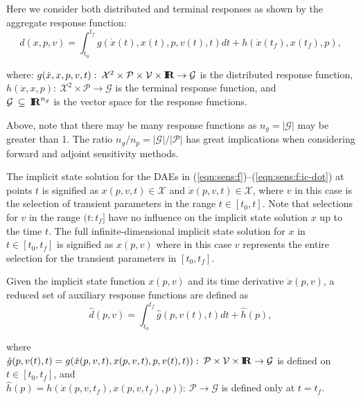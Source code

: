 \documentclass[pdf,ps2pdf,11pt]{SANDreport}
\begin{document}
Here we consider both distributed and terminal responses as shown by the
aggregate response function:
%
\begin{equation}
d(x,p,v)
= \int_{t_0}^{t_f} g(\dot{x}(t),x(t),p,v(t),t) dt + h(\dot{x}(t_f),x(t_f),p),
\label{eqn:sens:d}
\end{equation}
%

where:
\bifthen
%
%
{}\> $g(\dot{x},x,p,v,t) :{}\:
{}\mathcal{X}^2{}\times{}\mathcal{P}{}\times{}\mathcal{V}{}\times{}\mbox{\textbf{I}}\hspace{-0.6ex}\mbox{\textbf{R}}
{}\rightarrow{}\mathcal{G}$ is the distributed response function, \\
%
{}\> $h(\dot{x},x,p) :{}\: {}\mathcal{X}^2{}\times{}\mathcal{P}
{}\rightarrow{}\mathcal{G}$ is the terminal response function, and \\
%
{}\> $\mathcal{G}{}\:\subseteq\:\mbox{\textbf{I}}\hspace{-0.6ex}\mbox{\textbf{R}}^{n_g}$ is the vector space for the
response functions. \\
%
\eifthen

Above, note that there may be many response functions as $n_g=|\mathcal{G}|$
may be greater than 1.  The ratio $n_g/n_p=|\mathcal{G}|/|\mathcal{P}|$ has
great implications when considering forward and adjoint sensitivity methods.

The implicit state solution for the DAEs in
(\ref{eqn:sens:f})--(\ref{eqn:sens:f:ic-dot}) at
points $t$ is signified as $x(p,v,t)\in\mathcal{X}$ and
$\dot{x}(p,v,t)\in\mathcal{X}$, where $v$ in this case is the selection of
transient parameters in the range $t\in[t_0,t]$.  Note that selections for $v$
in the range $(t:t_f]$ have no influence on the implicit state solution $x$ up
to the time $t$.  The full infinite-dimensional implicit state solution for
$x$ in $t\in[t_0,t_f]$ is signified as $x(p,v)$ where in this case $v$
represents the entire selection for the transient parameters in $[t_0,t_f]$.

Given the implicit state function $x(p,v)$ and its time derivative
$\dot{x}(p,v)$, a reduced set of auxiliary response functions are defined as
%
\begin{equation}
\hat{d}(p,v)
= \int_{t_0}^{t_f} \hat{g}(p,v(t),t) dt + \hat{h}(p),
\label{eqn:sens:d_hat}
\end{equation}
\begin{tabbing}
\hspace{4ex}where\hspace{1ex}\= \\
\>  $\hat{g}(p,v(t),t) = g(\dot{x}(p,v,t),x(p,v,t),p,v(t),t)) : \:
    \mathcal{P} \times \mathcal{V} \times \mbox{\textbf{I}}\hspace{-0.6ex}\mbox{\textbf{R}} \rightarrow \mathcal{G}$ is defined on $t\in[t_0,t_f]$, and \\
\>  $\hat{h}(p) = h(\dot{x}(p,v,t_f),x(p,v,t_f),p)) : \:
    \mathcal{P} \rightarrow \mathcal{G}$ is defined only at $t=t_f$.
\end{tabbing}
\end{document}
